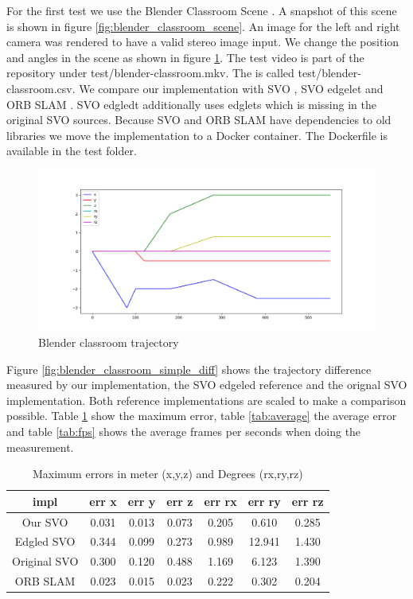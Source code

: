 \documentclass[11pt,a4paper,titlepage,oneside]{report}
\begin{document}
For the first test we use the Blender Classroom Scene \cite{blender}. A snapshot of this scene is shown in figure \ref{fig:blender_classroom_scene}. An image for the left and right camera was rendered to have a valid stereo image input. We change the position and angles in the scene as shown in figure \ref{fig:blender_classroom_simple_traj}. The test video is part of the repository under test/blender-classroom.mkv. The is called test/blender-classroom.csv. We compare our implementation with SVO \cite{svo}, SVO edgelet \cite{svo_edglet} and ORB SLAM \cite{orbslam}. SVO edgledt additionally uses edglets which is missing in the original SVO sources. Because SVO and ORB SLAM have dependencies to old libraries we move the implementation to a Docker container. The Dockerfile is available in the test folder. 

\begin{figure}[H]
  \includegraphics[width=1.0\textwidth]{img/blender_classroom_simple_traj.png}
  \caption{Blender classroom trajectory}\label{fig:blender_classroom_simple_traj}
\end{figure}

Figure \ref{fig:blender_classroom_simple_diff} shows the trajectory difference measured by our implementation, the SVO edgeled reference and the orignal SVO implementation. Both reference implementations are scaled to make a comparison possible. Table \ref{tab:maximas} show the maximum error, table \ref{tab:average} the average error and table \ref{tab:fps} shows the average frames per seconds when doing the measurement.

\begin{table}[H]
  \centering
  \begin{tabular}{|c|c|c|c|c|c|c|}
    impl & err x & err y & err z & err rx & err ry & err rz\\
    \hline
    Our SVO & 0.031 & 0.013 & 0.073 & 0.205 & 0.610 & 0.285\\
    Edgled SVO & 0.344 & 0.099 & 0.273 & 0.989 & 12.941 & 1.430\\
    Original SVO & 0.300 & 0.120 & 0.488 & 1.169 & 6.123 & 1.390\\
    ORB SLAM& 0.023 & 0.015 & 0.023 & 0.222 & 0.302 & 0.204
  \end{tabular}
  \caption{Maximum errors in meter (x,y,z) and Degrees (rx,ry,rz)}
  \label{tab:maximas}
\end{table}
\end{document}
